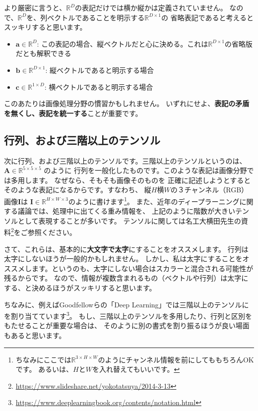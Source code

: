 \documentclass[uplatex,twocolumn,9pt,dvipdfmx]{jsarticle}
\begin{document}
より厳密に言うと、$\mathbb{R}^D$の表記だけでは横か縦かは定義されていません。
なので、$\mathbb{R}^D$を、列ベクトルであることを明示する$\mathbb{R}^{D \times 1}$の
省略表記であると考えるとスッキリすると思います。
\begin{itemize}
    \item $\mathbf{a} \in \mathbb{R}^D$: この表記の場合、縦ベクトルだと心に決める。これは$\mathbb{R}^{D \times 1}$の省略版だとも解釈できる
    \item $\mathbf{b} \in \mathbb{R}^{D \times 1}$: 縦ベクトルであると明示する場合
    \item $\mathbf{c} \in \mathbb{R}^{1 \times D}$: 横ベクトルであると明示する場合
\end{itemize}
このあたりは画像処理分野の慣習かもしれません。
いずれにせよ、\textbf{表記の矛盾を無くし、表記を統一する}ことが重要です。


\subsection{行列、および三階以上のテンソル}
次に行列、および三階以上のテンソルです。三階以上のテンソルというのは、
$\mathbf{A} \in \mathbb{R}^{5\times 5 \times 5}$ のように
行列を一般化したものです。このような表記は画像分野では多用します。
なぜなら、そもそも画像そのものを
正確に記述しようとするとそのような表記になるからです。すなわち、
縦$H$横$W$の３チャンネル（RGB）画像$\mathbf{I}$は
$\mathbf{I} \in \mathbb{R}^{H \times W \times 3}$のように書けます\footnote{
ちなみにここでは$\mathbb{R}^{3 \times H \times W}$のようにチャンネル情報を前にしてももちろんOKです。
あるいは、$H$と$W$を入れ替えてもいいです。}。
また、近年のディープラーニングに関する議論では、処理中に出てくる重み情報を、
上記のように階数が大きいテンソルとして表現することが多いです。
テンソルに関しては名工大横田先生の資料\footnote{\url{https://www.slideshare.net/yokotatsuya/2014-3-13}}をご参照ください。

さて、これらは、基本的に\textbf{大文字で太字}にすることをオススメします。
行列は太字にしないほうが一般的かもしれません。
しかし、私は太字にすることをオススメします。というのも、太字にしない場合はスカラーと混合される可能性が残るからです。
なので、情報が複数含まれるもの（ベクトルや行列）は太字にする、と決めるほうがスッキリすると思います。

ちなみに、例えばGoodfellowらの「Deep Learning」では三階以上のテンソルに
\texttt{\mathsf}を割り当てています\footnote{\url{https://www.deeplearningbook.org/contents/notation.html}}。
もし、三階以上のテンソルを多用したり、行列と区別をもたせることが重要な場合は、
そのように別の書式を割り振るほうが良い場面もあると思います。
\end{document}
